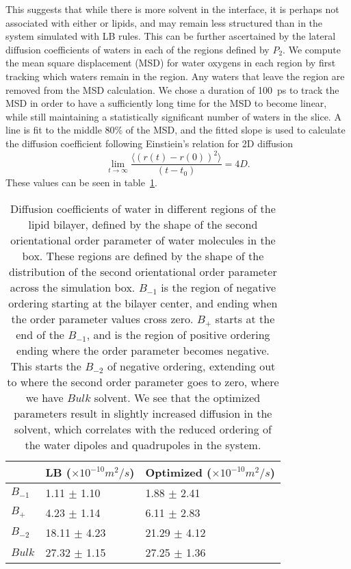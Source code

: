 This suggests that while there is more solvent in the interface, it is perhaps not
associated with either \na{} or lipids, and may remain less structured than
in the system simulated with LB rules.  
This can be further ascertained by the lateral diffusion coefficients of waters 
in each of the regions defined by $P_2$. 
We compute the mean square displacement (MSD) for water oxygens
in each region by first tracking which waters remain in the region. 
Any waters that leave the region are removed from the MSD calculation. 
We chose a duration of 100~ps to track the MSD in order
to have a sufficiently long time for the MSD to become linear, 
while still maintaining a statistically significant number of waters in the slice. 
A line is fit to the middle 80\% of the MSD, and the fitted
slope is used to calculate the diffusion coefficient following
Einstiein's relation for 2D diffusion
\begin{equation}
\lim_{t \to \infty}\frac{\big\langle (r(t) - r(0))^2 \big\rangle}{(t-t_0)} = 4D. 
\end{equation}
These values can be seen in table~\ref{tabch2:diff}. 
\begin{table}[H]
    \caption[Diffusion coefficients of water in different regions]{Diffusion coefficients of water in different regions of the lipid bilayer, 
defined by the shape of the second orientational order parameter of water molecules in the box. 
These regions are defined by the shape of the distribution of the second 
    orientational order parameter across the simulation box. $B_{-1}$ is the region 
    of negative ordering starting at the bilayer center, and ending 
    when the order parameter values cross zero. 
    $B_{+}$ starts at the end of the $B_{-1}$, and is the region of positive ordering ending where the order parameter 
    becomes negative. This starts the $B_{-2}$ of negative ordering, extending out to where the 
second order parameter goes to zero, where we have $Bulk$ solvent.
We see that the optimized parameters result in slightly 
    increased diffusion in the solvent, which correlates with the reduced
    ordering of the water dipoles and quadrupoles in the
system.}
    \label{tabch2:diff}
    {\footnotesize
    \begin{tabularx}{\textwidth}{X|X|X|}
              &LB ($\times 10^{-10} m^2/s$)&Optimized ($\times 10^{-10} m^2/s$)\\\hline
        $B_{-1}$ &1.11 $\pm$ 1.10& 1.88 $\pm$ 2.41   \\
        $B_+$    &4.23 $\pm$ 1.14& 6.11 $\pm$ 2.83  \\
        $B_{-2}$ &18.11 $\pm$ 4.23&21.29 $\pm$ 4.12 \\
        $Bulk$   &27.32 $\pm$ 1.15 &27.25 $\pm$ 1.36 \\
              \end{tabularx}
          }
\end{table}
